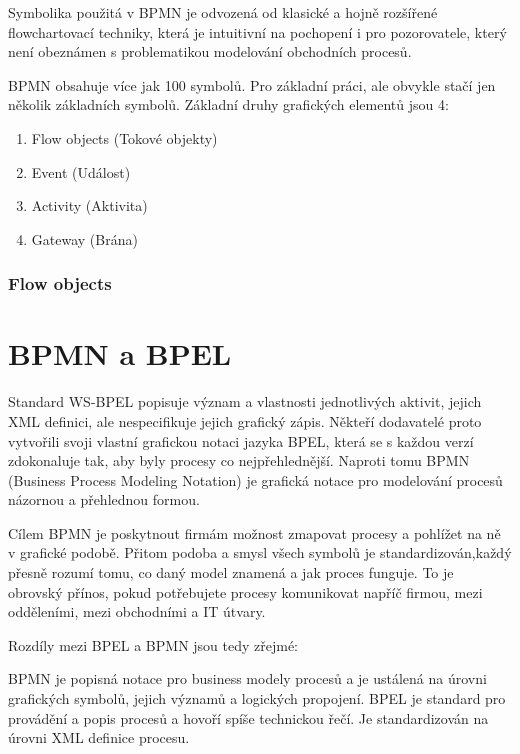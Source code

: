 \documentclass[]{article}
\begin{document}
Symbolika použitá v BPMN je odvozená od klasické a hojně rozšířené flowchartovací techniky, která je intuitivní na pochopení i pro pozorovatele, který není obeznámen s problematikou modelování obchodních procesů.

BPMN obsahuje více jak 100 symbolů. Pro základní práci, ale obvykle stačí jen několik základních symbolů. Základní druhy grafických elementů jsou 4: \cite{Dumas2013}

\begin{enumerate}
\item Flow objects (Tokové objekty)
\item Event (Událost)
\item Activity (Aktivita)
\item Gateway (Brána)
\end{enumerate}

\subsubsection{Flow objects}

\section{BPMN a BPEL}
Standard WS-BPEL popisuje význam a vlastnosti jednotlivých aktivit, jejich XML definici, ale nespecifikuje jejich grafický zápis.
Někteří dodavatelé proto vytvořili svoji vlastní grafickou notaci jazyka BPEL, která se s každou verzí zdokonaluje tak, aby byly procesy co nejpřehlednější.
Naproti tomu BPMN (Business Process Modeling Notation) je grafická notace pro modelování procesů názornou a přehlednou formou.

Cílem BPMN je poskytnout firmám možnost zmapovat procesy a pohlížet na ně v grafické podobě. Přitom podoba a smysl všech symbolů je standardizován,každý přesně rozumí tomu, co daný model znamená a jak proces funguje. To je obrovský přínos, pokud potřebujete procesy komunikovat napříč firmou, mezi odděleními, mezi obchodními a IT útvary.


Rozdíly mezi BPEL a BPMN jsou tedy zřejmé:

BPMN je popisná notace pro business modely procesů a je ustálená na úrovni grafických symbolů, jejich významů a logických propojení.
BPEL je standard pro provádění a popis procesů a hovoří spíše technickou řečí. Je standardizován na úrovni XML definice procesu. \cite{BPELcz} %


\nocite{*}


\end{document}
